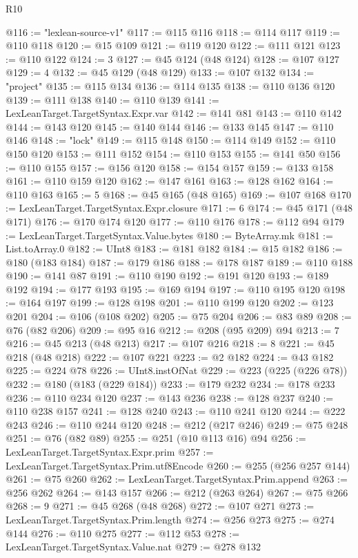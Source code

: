 \begin{lexlean}{R10}
\begin{coremodule}
@116 := "lexlean-source-v1"
@117 := @115 @116
@118 := @114 @117
@119 := @110 @118
@120 := @15 @109
@121 := @119 @120
@122 := @111 @121
@123 := @110 @122
@124 := 3
@127 := @45 @124 (@48 @124)
@128 := @107 @127
@129 := 4
@132 := @45 @129 (@48 @129)
@133 := @107 @132
@134 := "project"
@135 := @115 @134
@136 := @114 @135
@138 := @110 @136 @120
@139 := @111 @138
@140 := @110 @139
@141 := LexLeanTarget.TargetSyntax.Expr.var
@142 := @141 @81
@143 := @110 @142
@144 := @143 @120
@145 := @140 @144
@146 := @133 @145
@147 := @110 @146
@148 := "lock"
@149 := @115 @148
@150 := @114 @149
@152 := @110 @150 @120
@153 := @111 @152
@154 := @110 @153
@155 := @141 @50
@156 := @110 @155
@157 := @156 @120
@158 := @154 @157
@159 := @133 @158
@161 := @110 @159 @120
@162 := @147 @161
@163 := @128 @162
@164 := @110 @163
@165 := 5
@168 := @45 @165 (@48 @165)
@169 := @107 @168
@170 := LexLeanTarget.TargetSyntax.Expr.closure
@171 := 6
@174 := @45 @171 (@48 @171)
@176 := @170 @174 @120
@177 := @110 @176
@178 := @112 @94
@179 := LexLeanTarget.TargetSyntax.Value.bytes
@180 := ByteArray.mk
@181 := List.toArray.{0}
@182 := UInt8
@183 := @181 @182
@184 := @15 @182
@186 := @180 (@183 @184)
@187 := @179 @186
@188 := @178 @187
@189 := @110 @188
@190 := @141 @87
@191 := @110 @190
@192 := @191 @120
@193 := @189 @192
@194 := @177 @193
@195 := @169 @194
@197 := @110 @195 @120
@198 := @164 @197
@199 := @128 @198
@201 := @110 @199 @120
@202 := @123 @201
@204 := @106 (@108 @202)
@205 := @75 @204
@206 := @83 @89
@208 := @76 (@82 @206)
@209 := @95 @16
@212 := @208 (@95 @209) @94
@213 := 7
@216 := @45 @213 (@48 @213)
@217 := @107 @216
@218 := 8
@221 := @45 @218 (@48 @218)
@222 := @107 @221
@223 := @2 @182
@224 := @43 @182
@225 := @224 @78
@226 := UInt8.instOfNat
@229 := @223 (@225 (@226 @78))
@232 := @180 (@183 (@229 @184))
@233 := @179 @232
@234 := @178 @233
@236 := @110 @234 @120
@237 := @143 @236
@238 := @128 @237
@240 := @110 @238 @157
@241 := @128 @240
@243 := @110 @241 @120
@244 := @222 @243
@246 := @110 @244 @120
@248 := @212 (@217 @246)
@249 := @75 @248
@251 := @76 (@82 @89)
@255 := @251 (@10 @113 @16) @94
@256 := LexLeanTarget.TargetSyntax.Expr.prim
@257 := LexLeanTarget.TargetSyntax.Prim.utf8Encode
@260 := @255 (@256 @257 @144)
@261 := @75 @260
@262 := LexLeanTarget.TargetSyntax.Prim.append
@263 := @256 @262
@264 := @143 @157
@266 := @212 (@263 @264)
@267 := @75 @266
@268 := 9
@271 := @45 @268 (@48 @268)
@272 := @107 @271
@273 := LexLeanTarget.TargetSyntax.Prim.length
@274 := @256 @273
@275 := @274 @144
@276 := @110 @275
@277 := @112 @53
@278 := LexLeanTarget.TargetSyntax.Value.nat
@279 := @278 @132

\end{coremodule}
\end{lexlean}
